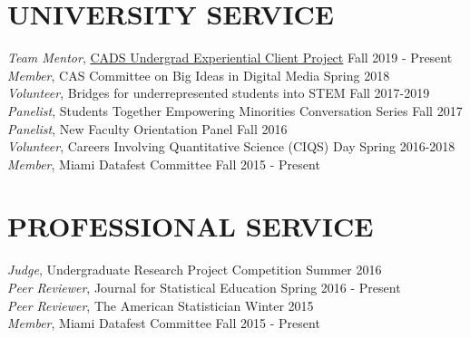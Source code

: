 \documentclass[margin, 10pt]{res}\usepackage[]{graphicx}\usepackage[]{color}
\begin{document}
\begin{resume}
\vspace{0.1in}

\section{UNIVERSITY SERVICE} 

{\it Team Mentor}, \href{https://miamioh.edu/fsb/centers/cads/experiential-learning/projects/index.html}{CADS Undergrad Experiential Client Project}  \hfill Fall 2019 - Present \\
{\it Member}, CAS Committee on Big Ideas in Digital Media \hfill  Spring 2018 \\
{\it Volunteer}, Bridges for underrepresented students into STEM \hfill  Fall 2017-2019 \\
{\it Panelist}, Students Together Empowering Minorities Conversation Series \hfill Fall 2017\\
{\it Panelist}, New Faculty Orientation Panel \hfill  Fall 2016 \\
{\it Volunteer}, Careers Involving Quantitative Science (CIQS) Day  \hfill  Spring 2016-2018  
{\it Member}, Miami Datafest Committee \hfill  Fall 2015 - Present\\

\vspace{0.1in}

\section{PROFESSIONAL SERVICE} 
{\it Judge}, Undergraduate Research Project Competition \hfill  Summer 2016 \\
{\it Peer Reviewer}, Journal for Statistical Education \hfill  Spring 2016 - Present  \\
{\it Peer Reviewer}, The American Statistician \hfill  Winter 2015 \\
{\it Member}, Miami Datafest Committee \hfill  Fall 2015 - Present  \\


\end{resume}
\end{document}
